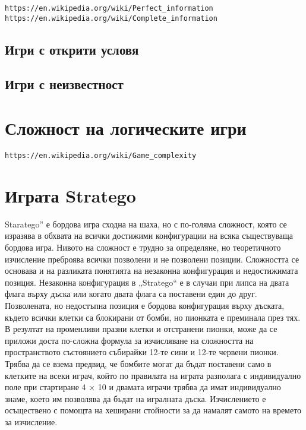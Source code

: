 \begin{lstlisting}
https://en.wikipedia.org/wiki/Perfect_information
https://en.wikipedia.org/wiki/Complete_information
\end{lstlisting}

\subsection{Игри с открити условя}

\subsection{Игри с неизвестност}

\section{Сложност на логическите игри}

\begin{lstlisting}
https://en.wikipedia.org/wiki/Game_complexity
\end{lstlisting}

\section{Играта Stratego}

Staratego” е бордова игра сходна на шаха, но с по-голяма сложност, която се изразява в обхвата на всички достижими конфигурации на всяка съществуваща бордова игра. Нивото на сложност е трудно за определяне, но теоретичното изчисление преброява всички позволени и не позволени позиции. Сложността се основава и на разликата понятията на незаконна конфигурация и недостижимата позиция. Незаконна конфигурация в „Stratego“ е в случаи при липса на двата флага върху дъска или когато двата флага са поставени един до друг. Позволената, но недостъпна позиция е бордова конфигурация върху дъската, където всички клетки са блокирани от бомби, но пионката е преминала през тях. В резултат на променливи празни клетки и отстранени пионки, може да се приложи доста по-сложна формула за изчисляване на сложността на пространството състоянието събирайки 12-те сини и 12-те червени пионки. Трябва да се взема предвид, че бомбите могат да бъдат поставени само в клетките на всеки играч, който по правилата на играта разполага с индивидуално поле при стартиране 4 × 10 и двамата играчи трябва да имат индивидуално знаме, което им позволява да бъдат на игралната дъска. Изчислението е осъществено с помощта на хеширани стойности за да намалят самото на времето за изчисление.

